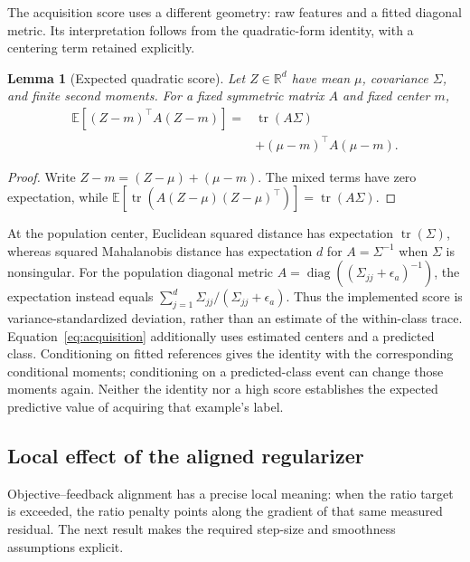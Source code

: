 \documentclass[10pt,a4paper,twocolumn]{article}
\newtheorem{lemma}[proposition]{Lemma}
\newcommand{\E}{\mathbb{E}}
\newcommand{\R}{\mathbb{R}}
\newcommand{\tr}{\operatorname{tr}}
\begin{document}
The acquisition score uses a different geometry: raw features and
a fitted diagonal metric. Its interpretation follows from the
quadratic-form identity, with a centering term retained explicitly.

\begin{lemma}[Expected quadratic score]
\label{lem:mahalanobis}
Let $Z\in\R^d$ have mean $\mu$, covariance $\Sigma$, and finite
second moments. For a fixed symmetric matrix $A$ and fixed center $m$,
\begin{equation}
 \begin{aligned}
 \E[(Z-m)^\top A(Z-m)]
  ={}&\tr(A\Sigma)\\
    &+(\mu-m)^\top A(\mu-m).
 \end{aligned}
 \label{eq:quadratic_expectation}
\end{equation}
\end{lemma}
\begin{proof}
Write $Z-m=(Z-\mu)+(\mu-m)$. The mixed terms have zero
expectation, while
$\E[\tr(A(Z-\mu)(Z-\mu)^\top)]=\tr(A\Sigma)$.
\end{proof}

At the population center, Euclidean squared distance has expectation
$\tr(\Sigma)$, whereas squared Mahalanobis distance has expectation
$d$ for $A=\Sigma^{-1}$ when $\Sigma$ is nonsingular.
For the population diagonal metric
$A=\operatorname{diag}((\Sigma_{jj}+\epsilon_a)^{-1})$,
the expectation instead equals
$\sum_{j=1}^d\Sigma_{jj}/(\Sigma_{jj}+\epsilon_a)$.
Thus the implemented score is variance-standardized deviation,
rather than an estimate of the within-class trace.
Equation~\eqref{eq:acquisition} additionally uses estimated centers
and a predicted class. Conditioning on fitted references gives the
identity with the corresponding conditional moments; conditioning
on a predicted-class event can change those moments again.
Neither the identity nor a high score establishes the expected
predictive value of acquiring that example's label.

\subsection{Local effect of the aligned regularizer}
\label{sec:analysis_alignment}

Objective--feedback alignment has a precise local meaning: when
the ratio target is exceeded, the ratio penalty points along the
gradient of that same measured residual. The next result makes
the required step-size and smoothness assumptions explicit.
\end{document}
